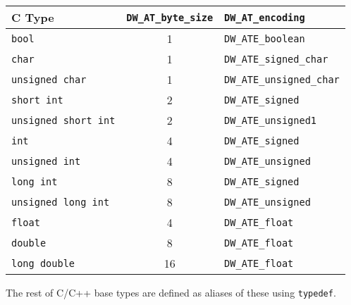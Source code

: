 \begin{center}
  \begin{tabular}{lcl}
    \toprule
    C Type & \verb|DW_AT_byte_size| & \verb|DW_AT_encoding| \\
    \midrule
    \texttt{bool}               & 1 & \verb|DW_ATE_boolean| \\
    \texttt{char}               & 1 & \verb|DW_ATE_signed_char| \\
    \texttt{unsigned char}      & 1 & \verb|DW_ATE_unsigned_char| \\
    \texttt{short int}          & 2 & \verb|DW_ATE_signed| \\
    \texttt{unsigned short int} & 2 & \verb|DW_ATE_unsigned1| \\
    \texttt{int}                & 4 & \verb|DW_ATE_signed| \\
    \texttt{unsigned int}       & 4 & \verb|DW_ATE_unsigned| \\
    \texttt{long int}           & 8 & \verb|DW_ATE_signed| \\
    \texttt{unsigned long int}  & 8 & \verb|DW_ATE_unsigned| \\
    \texttt{float}              & 4 & \verb|DW_ATE_float| \\
    \texttt{double}             & 8 & \verb|DW_ATE_float| \\
    \texttt{long double}        & 16& \verb|DW_ATE_float| \\
    \bottomrule
  \end{tabular}
\end{center}

The rest of C/C++ base types are defined as aliases of these
using \texttt{typedef}.



